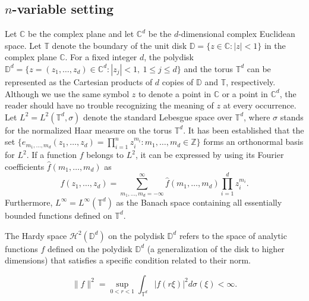\documentclass[12pt, reqno]{amsart}
\theoremstyle{definition}
\theoremstyle{remark}
\numberwithin{equation}{section}
\begin{document}
\subsection{$n$-variable setting}
Let $\mathbb{C}$ be the complex plane and let $\mathbb{C}^d$ be the $d$-dimensional complex Euclidean space. Let $\mathbb{T}$ denote the boundary of the unit disk $\mathbb{D}=\{z\in \mathbb{C}: |z|<1\}$ in the complex plane $\mathbb{C}$. For a fixed integer $d$, the polydisk $\mathbb{D}^d=\{z=(z_1, \dots, z_d)\in \mathbb{C}^d: |z_j|<1,~1\leq j\leq d\}$ and the torus $\mathbb{T}^d$ can be represented as the Cartesian products of $d$ copies of $\mathbb{D}$ and $\mathbb{T}$, respectively. Although we use the same symbol $z$ to denote a point in $\mathbb{C}$ or a point in $\mathbb{C}^d$, the reader should have no trouble recognizing the meaning of $z$ at every occurrence. Let $L^2=L^2(\mathbb{T}^d, \sigma)$ denote the standard Lebesgue space over $\mathbb{T}^d$, where $\sigma$ stands for the normalized Haar measure on the torus $\mathbb{T}^d$. It has been established that the set $\{e_{m_1, \dots, m_d}(z_1, \dots, z_d)=\prod_{i=1}^{n}z_i^{m_i}: m_1, \dots, m_d\in \mathbb{Z}\}$ forms an orthonormal basis for $L^2$. If a function $f$ belongs to $L^2$, it can be expressed by using its Fourier coefficients $\hat{f}(m_1, \dots, m_d)$ as 
$$f(z_1, \dots, z_d)=\sum_{m_1, \dots, m_d=-\infty}^{\infty}\widehat{f}(m_1, \dots, m_d)\prod_{i=1}^{d}z_i^{m_i}.$$
Furthermore, $L^\infty=L^\infty(\mathbb{T}^d)$ as the Banach space containing all essentially bounded functions defined on $\mathbb{T}^d$. 
\par
The Hardy space $\mathcal{H}^2(\mathbb{D}^d)$
 on the polydisk $\mathbb{D}^d$ refers to the space of analytic functions $f$
 defined on the polydisk $\mathbb{D}^d$ (a generalization of the disk to higher dimensions) that satisfies a specific condition related to their norm.


$$\|f\|^2=\sup_{0<r<1}\int_{\mathbb{T}^d}|f(r\xi)|^2d\sigma(\xi)<\infty.$$
\end{document}
